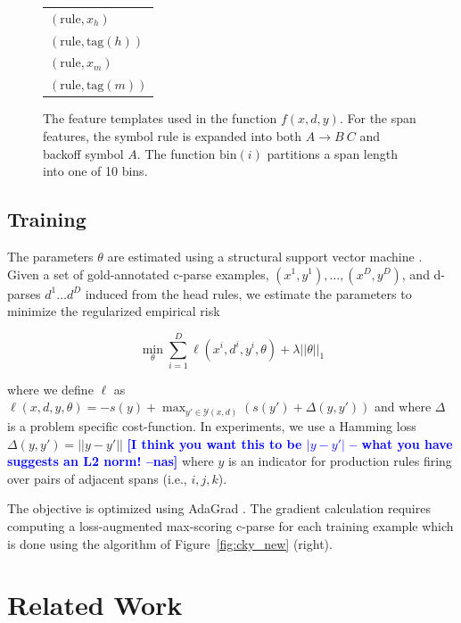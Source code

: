 \documentclass[11pt,letterpaper]{article}
\newcommand{\RuleSym}{\mathrm{rule}}
\newcommand{\Rule}[3]{#1 \rightarrow #2\ #3}
\newcommand{\BinFN}[1]{\mathrm{bin}({#1})}
\newcommand{\TagFN}[1]{\mathrm{tag}({#1})}
\newcommand{\WordFN}[1]{x_{#1}}
\newcommand{\nascomment}[1]{\textcolor{blue}{\bf \small [#1 --nas]}}
\begin{document}
\begin{figure}
\begin{multicols}{2}
\begin{tabular}{l}
  $(\RuleSym, \WordFN{h})$ \\
  $(\RuleSym, \TagFN{h})$ \\
  $(\RuleSym, \WordFN{m})$ \\
  $(\RuleSym, \TagFN{m})$ \\

  \bottomrule

  \end{tabular}
  \end{multicols}

  \caption{The feature templates used in the function $f(x, d, y)$. For the span features, the symbol $\RuleSym$ is expanded into both $\Rule{A}{B}{C}$ and backoff symbol $A$. The function $\BinFN{i}$ partitions a span length into one of 10 bins.
   \label{fig:features} }
\end{figure}

\subsection{Training}

The parameters $\theta$ are estimated using a structural support
vector machine \cite{taskar-04}.
Given a set of gold-annotated c-parse examples, $(x^{1}, y^{1}), \ldots,
(x^{D}, y^{D})$, and d-parses $d^{1} \ldots d^{D}$ induced
from the head rules, we estimate the
parameters to minimize the regularized empirical risk

\[ \min_{\theta} \sum_{i = 1}^D  \ell( x^{i}, d^{i} , y^{i}, \theta)  + \lambda ||\theta||_1 \]

\noindent where we define $\ell$ as
$\ell(x, d, y, \theta) = - s(y) + \max_{y' \in \mathcal{Y}(x, d)}\left(s(y')  + \Delta(y, y') \right) $
\noindent and where $\Delta$ is a problem specific cost-function.
In experiments, we use a Hamming loss  $\Delta(y, y') = || y -y'||$
\nascomment{I think you want this to be $|y-y'|$ -- what you have
  suggests an L2 norm!}
where $y$ is an indicator for production rules firing over pairs of
adjacent spans (i.e., $i, j, k$).

The objective is optimized using AdaGrad \cite{duchi2011adaptive}.  The gradient
calculation requires computing a loss-augmented max-scoring c-parse for each
training example which is done using the algorithm of
Figure~\ref{fig:cky_new} (right).


\section{Related Work}
\end{document}
